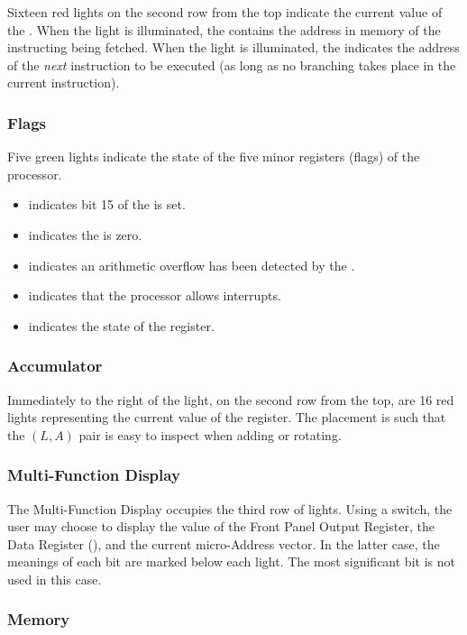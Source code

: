 Sixteen red lights on the second row from the top indicate the current value of
the \PC. When the  light is illuminated, the \PC{} contains the
address in memory of the instructing being fetched. When the  light is
illuminated, the \PC{} indicates the address of the {\em next\/} instruction to
be executed (as long as no branching takes place in the current instruction).

\subsubsection{Flags}

Five green lights indicate the state of the five minor registers (flags) of the
processor.

\begin{itemize}
\item {} indicates bit 15 of the \A{} is set.
\item {} indicates the \A{} is zero.
\item {} indicates an arithmetic overflow has been detected by the \ALU.
\item {} indicates that the processor allows interrupts.
\item {} indicates the state of the \Lreg{} register.
\end{itemize}

\subsubsection{Accumulator}

Immediately to the right of the  light, on the second row from the top,
are 16 red lights representing the current value of the \A{} register. The
placement is such that the $(L,A)$ pair is easy to inspect when adding or
rotating.

\subsubsection{Multi-Function Display}

The Multi-Function Display occupies the third row of lights. Using a switch,
the user may choose to display the value of the Front Panel Output Register,
the Data Register (\DR), and the current micro-Address vector. In the latter
case, the meanings of each bit are marked below each light. The most
significant bit is not used in this case.

\subsubsection{Memory}

